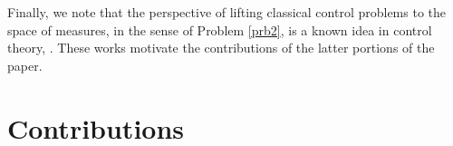 \documentclass{article}
\begin{document}
Finally, we note that the perspective of lifting classical control problems to the space of measures, in the sense of Problem \ref{prb2}, is a known idea in control theory,   \cite{borkar2002convex,hernandez1996linear,lasserre2008nonlinear,majumdar2014convex}. These works motivate the contributions of the latter portions of the paper.



\section*{Contributions}




\end{document}
